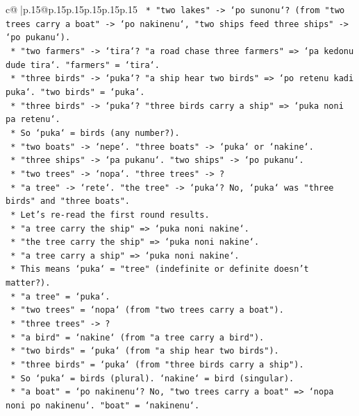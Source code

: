 \documentclass{article}
\begin{document}
{\begin{supertabular}{c@{$\;$}|p{.15\linewidth}@{}p{.15\linewidth}p{.15\linewidth}p{.15\linewidth}p{.15\linewidth}p{.15\linewidth}}
{{{\texttt{    *   "two lakes" {-}> `po sunonu`? (from "two trees carry a boat" {-}> `po nakinenu`, "two ships feed three ships" {-}> `po pukanu`).} \\
\texttt{    *   "two farmers" {-}> `tira`? "a road chase three farmers" => `pa kedonu dude tira`. "farmers" = `tira`.} \\
\texttt{    *   "three birds" {-}> `puka`? "a ship hear two birds" => `po retenu kadi puka`. "two birds" = `puka`.} \\
\texttt{    *   "three birds" {-}> `puka`? "three birds carry a ship" => `puka noni pa retenu`.} \\
\texttt{    *   So `puka` = birds (any number?).} \\
\texttt{    *   "two boats" {-}> `nepe`. "three boats" {-}> `puka` or `nakine`.} \\
\texttt{    *   "three ships" {-}> `pa pukanu`. "two ships" {-}> `po pukanu`.} \\
\texttt{    *   "two trees" {-}> `nopa`. "three trees" {-}> ?} \\
\texttt{    *   "a tree" {-}> `rete`. "the tree" {-}> `puka`? No, `puka` was "three birds" and "three boats".} \\
\texttt{    *   Let's re{-}read the first round results.} \\
\texttt{    *   "a tree carry the ship" => `puka noni nakine`.} \\
\texttt{    *   "the tree carry the ship" => `puka noni nakine`.} \\
\texttt{    *   "a tree carry a ship" => `puka noni nakine`.} \\
\texttt{    *   This means `puka` = "tree" (indefinite or definite doesn't matter?).} \\
\texttt{    *   "a tree" = `puka`.} \\
\texttt{    *   "two trees" = `nopa` (from "two trees carry a boat").} \\
\texttt{    *   "three trees" {-}> ?} \\
\texttt{    *   "a bird" = `nakine` (from "a tree carry a bird").} \\
\texttt{    *   "two birds" = `puka` (from "a ship hear two birds").} \\
\texttt{    *   "three birds" = `puka` (from "three birds carry a ship").} \\
\texttt{    *   So `puka` = birds (plural). `nakine` = bird (singular).} \\
\texttt{    *   "a boat" = `po nakinenu`? No, "two trees carry a boat" => `nopa noni po nakinenu`. "boat" = `nakinenu`.} \\
}}}
\end{supertabular}}
\end{document}
